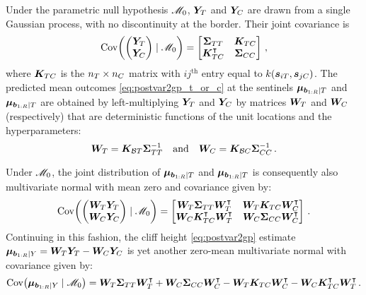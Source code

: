Under the parametric null hypothesis \(\mathscr{M}_0\), \(\bm{Y}_{T}\) and \(\bm{Y}_{C}\) are drawn from a single Gaussian process, with no discontinuity at the border.
Their joint covariance is
\begin{equation}
\cov \del{\begin{pmatrix}\yt \\ \yc\end{pmatrix} \mid \modnull } 
    = \begin{bmatrix}
        \STT & \KTC \\
        \KTC \trans & \SCC
    \end{bmatrix}\,,
\end{equation}
where \(\bm{K}_{T C}\) is the \(n_T \times n_C\) matrix with \(ij^{\mathrm{th}}\) entry equal to \(k\del{\svec_{i\treat},\svec_{j\ctrol}}\).
The predicted mean outcomes \autoref{eq:postvar2gp_t_or_c} at the sentinels \(\bm{\mu}_{\bm{b}_{1:R} \mid T}\) and \(\bm{\mu}_{\bm{b}_{1:R} \mid T}\) are obtained by left-multiplying \(\bm{Y}_{T}\) and \(\bm{Y}_{C}\) by matrices \(\bm{W}_{T}\) and \(\bm{W}_{C}\) (respectively) that are deterministic functions of the unit locations and the hyperparameters:
\begin{equation}
    \bm{W}_{T} = \bm{K}_{\mathcal{B} T} \bm{\Sigma}_{T T}^{-1} \quad\text{and}\quad
    \bm{W}_{C} = \bm{K}_{\mathcal{B} C} \bm{\Sigma}_{C C}^{-1}\,.
\end{equation}

Under \(\mathscr{M}_0\), the joint distribution of \(\bm{\mu}_{\bm{b}_{1:R} \mid T}\) and \(\bm{\mu}_{\bm{b}_{1:R} \mid T}\) is consequently also multivariate normal with mean zero and covariance given by:
\begin{equation}
\cov \del{\begin{pmatrix}\WT \yt \\ \WC \yc \end{pmatrix} \mid \modnull } = \begin{bmatrix}
    \WT \STT       \WT\trans & \WT \KTC \WC\trans \\
    \WC \KTC\trans \WT\trans & \WC \SCC \WC\trans
\end{bmatrix}\,.
\end{equation}
Continuing in this fashion, the cliff height \autoref{eq:postvar2gp} estimate 
\(\bm{\mu}_{\bm{b}_{1:R} \mid Y} = \bm{W}_{T} \bm{Y}_{T} - \bm{W}_{C} \bm{Y}_{C}\)
is yet another zero-mean multivariate normal with covariance given by:
\begin{equation}
        \cov \del{\muvec_{\sentinels \mid Y} \mid \modnull} 
        = \WT \STT \WT\trans + \WC \SCC \WC\trans - \WT \KTC \WC\trans -  \WC\KTC\trans\WT\trans \,.
\end{equation}

